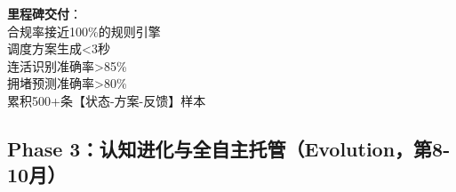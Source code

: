 \documentclass[12pt,a4paper]{article}
\begin{document}
\begin{tcolorbox}[colback=blue!5!white,colframe=blue!75!black,title=\textbf{阶段目标：引入大模型，开始积累SFT（Supervised Fine-Tuning）数据}]
\vspace{0.3cm}
\colorbox{green!20}{\parbox{0.95\linewidth}{
\textbf{里程碑交付}：\\
\checkmark 合规率接近100\%的规则引擎\\
\checkmark 调度方案生成<3秒\\
\checkmark 连活识别准确率>85\%\\
\checkmark 拥堵预测准确率>80\%\\
\checkmark 累积500+条【状态-方案-反馈】样本
}}
\end{tcolorbox}

\vspace{0.5cm}

\subsection{Phase 3：认知进化与全自主托管（Evolution，第8-10月）}
\end{document}
